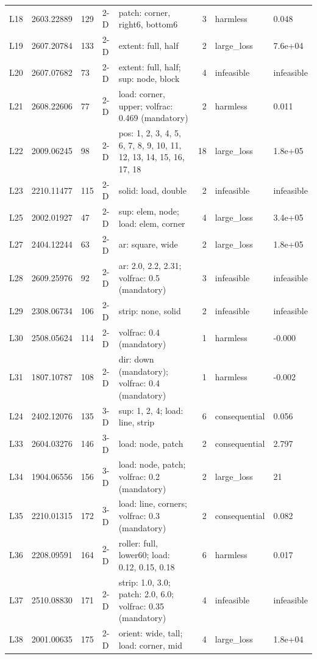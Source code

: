\begin{table}[t]
\begin{tabular}{lllllrll}
L18 & 2603.22889 & 129 & 2-D & patch: corner, right6, bottom6 & 3 & harmless & 0.048 \\
L19 & 2607.20784 & 133 & 2-D & extent: full, half & 2 & large\_loss & 7.6e+04 \\
L20 & 2607.07682 & 73 & 2-D & extent: full, half; sup: node, block & 4 & infeasible & infeasible \\
L21 & 2608.22606 & 77 & 2-D & load: corner, upper; volfrac: 0.469 (mandatory) & 2 & harmless & 0.011 \\
L22 & 2009.06245 & 98 & 2-D & pos: 1, 2, 3, 4, 5, 6, 7, 8, 9, 10, 11, 12, 13, 14, 15, 16, 17, 18 & 18 & large\_loss & 1.8e+05 \\
L23 & 2210.11477 & 115 & 2-D & solid: load, double & 2 & infeasible & infeasible \\
L25 & 2002.01927 & 47 & 2-D & sup: elem, node; load: elem, corner & 4 & large\_loss & 3.4e+05 \\
L27 & 2404.12244 & 63 & 2-D & ar: square, wide & 2 & large\_loss & 1.8e+05 \\
L28 & 2609.25976 & 92 & 2-D & ar: 2.0, 2.2, 2.31; volfrac: 0.5 (mandatory) & 3 & infeasible & infeasible \\
L29 & 2308.06734 & 106 & 2-D & strip: none, solid & 2 & infeasible & infeasible \\
L30 & 2508.05624 & 114 & 2-D & volfrac: 0.4 (mandatory) & 1 & harmless & -0.000 \\
L31 & 1807.10787 & 108 & 2-D & dir: down (mandatory); volfrac: 0.4 (mandatory) & 1 & harmless & -0.002 \\
L24 & 2402.12076 & 135 & 3-D & sup: 1, 2, 4; load: line, strip & 6 & consequential & 0.056 \\
L33 & 2604.03276 & 146 & 3-D & load: node, patch & 2 & consequential & 2.797 \\
L34 & 1904.06556 & 156 & 3-D & load: node, patch; volfrac: 0.2 (mandatory) & 2 & large\_loss & 21 \\
L35 & 2210.01315 & 172 & 3-D & load: line, corners; volfrac: 0.3 (mandatory) & 2 & consequential & 0.082 \\
L36 & 2208.09591 & 164 & 2-D & roller: full, lower60; load: 0.12, 0.15, 0.18 & 6 & harmless & 0.017 \\
L37 & 2510.08830 & 171 & 2-D & strip: 1.0, 3.0; patch: 2.0, 6.0; volfrac: 0.35 (mandatory) & 4 & infeasible & infeasible \\
L38 & 2001.00635 & 175 & 2-D & orient: wide, tall; load: corner, mid & 4 & large\_loss & 1.8e+04 \\

\end{tabular}
\end{table}
